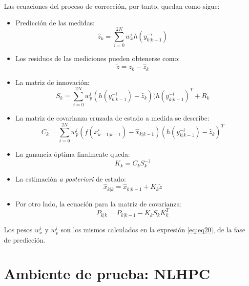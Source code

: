 \begin{enumerate}
Las ecuaciones del proceso de correcci\'on, por tanto, quedan como sigue:
\begin{itemize}
\item Predicci\'on de las medidas:\\
\begin{equation}
\label{eq:eq25}
\hat{z}_{k} = \sum_{i=0}^{2N} w_x^i h(y_{k|k-1}^{-i})
\end{equation}
\item Los residuos de las mediciones pueden obtenerse como:\\
\begin{equation}
\tilde{z} = z_k - \hat{z}_k
\label{eq:eq26}
\end{equation}
\item La matriz de innovaci\'on:\\
\begin{equation}
S_k = \sum_{i=0}^{2N} w_p^i (h(y_{k|k-1}^{-i}) - \hat{z}_k)(h(y_{k|k-1}^{-i})^T + R_k 
\label{eq:eq27}
\end{equation}
\item La matriz de covarianza cruzada de estado a medida se describe:\\
\begin{equation}
C_k = \sum_{i=0}^{2N} w_p^i ( f(\bar{x}^i_{k-1 | k-1})- \hat{x}_{k|k-1} )( h(y_{k|k-1}^{-i}) - \hat{z}_k )^T
\label{eq:eq28}
\end{equation}
\item La ganancia \'optima finalmente queda:\\
\begin{equation}
K_k = C_kS_k^{-1}
\label{eq:eq29}
\end{equation}
\item La estimaci\'on \textit{a posteriori} de estado:\\
\begin{equation}
\label{eq:eq30}
 \hat{x}_{k|k} =  \hat{x}_{k|k-1} + K_k \tilde{z}
\end{equation}
\item Por otro lado, la ecuaci\'on para la matriz de covarianza:\\
\begin{equation}
\label{eq:eq31}
P_{k|k} = P_{k|k-1} - K_kS_kK_k^T
\end{equation}
\end{itemize}
Los pesos $w_x^i$ y $w_p^i$ son los mismos calculados en la expresi\'on \ref{eq:eq20}, de la fase de predicci\'on.
\end{enumerate}

\section{Ambiente de prueba: NLHPC}